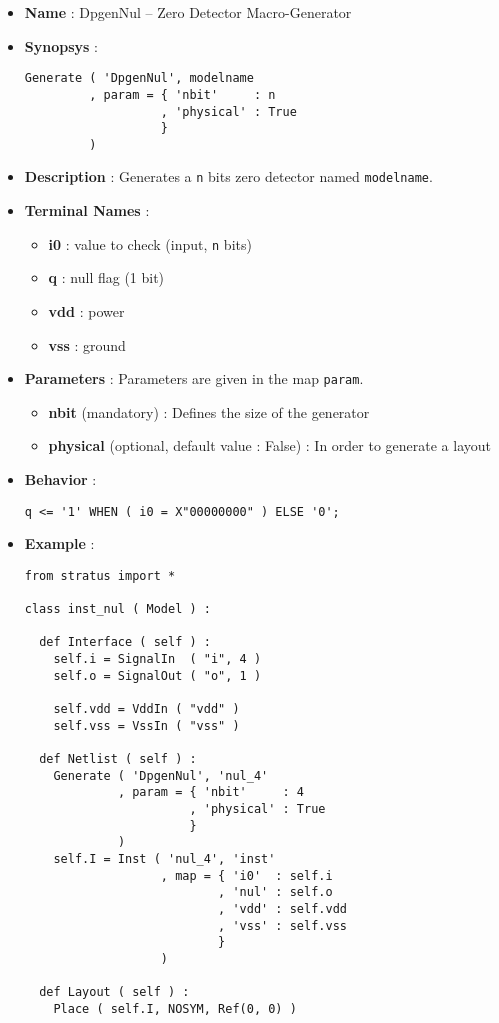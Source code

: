 \begin{itemize}
    \item \textbf{Name} : DpgenNul -- Zero Detector Macro-Generator
    \item \textbf{Synopsys} :
\begin{verbatim}
Generate ( 'DpgenNul', modelname
         , param = { 'nbit'     : n
                   , 'physical' : True         
                   }
         )
\end{verbatim}
    \item \textbf{Description} : Generates a \verb-n- bits zero detector named \verb-modelname-.
    \item \textbf{Terminal Names} :
    \begin{itemize}
        \item \textbf{i0} : value to check (input, \verb-n- bits)
        \item \textbf{q} : null flag (1 bit)
        \item \textbf{vdd} : power
        \item \textbf{vss} : ground
    \end{itemize}
    \item \textbf{Parameters} : Parameters are given in the map \verb-param-.
    \begin{itemize}
        \item \textbf{nbit} (mandatory) : Defines the size of the generator
        \item \textbf{physical} (optional, default value : False) : In order to generate a layout        
    \end{itemize}
    \item \textbf{Behavior} :
\begin{verbatim}
q <= '1' WHEN ( i0 = X"00000000" ) ELSE '0';
\end{verbatim}
    \item \textbf{Example} :
\begin{verbatim}
from stratus import *

class inst_nul ( Model ) :

  def Interface ( self ) :
    self.i = SignalIn  ( "i", 4 )
    self.o = SignalOut ( "o", 1 )
    
    self.vdd = VddIn ( "vdd" )
    self.vss = VssIn ( "vss" )
    
  def Netlist ( self ) :
    Generate ( 'DpgenNul', 'nul_4'
             , param = { 'nbit'     : 4
                       , 'physical' : True
                       }
             )
    self.I = Inst ( 'nul_4', 'inst'
                   , map = { 'i0'  : self.i
                           , 'nul' : self.o
                           , 'vdd' : self.vdd
                           , 'vss' : self.vss
                           }
                   )
      
  def Layout ( self ) :
    Place ( self.I, NOSYM, Ref(0, 0) )
\end{verbatim}
\end{itemize}
